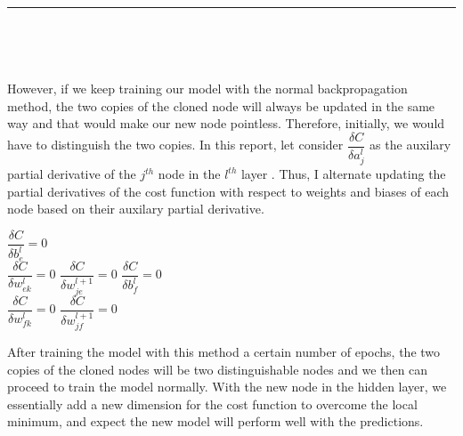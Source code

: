 \documentclass[12pt,english,]{article}
\let\origfigure\figure
\let\endorigfigure\endfigure
\renewenvironment{figure}[1][2] {
    \expandafter\origfigure\expandafter[H]
} {
    \endorigfigure
}
\begin{document}
\hrule

~

~

However, if we keep training our model with the normal backpropagation method, the two copies of the cloned node will always be updated in the same way and that would make our new node pointless. Therefore, initially, we would have to distinguish the two copies. In this report, let consider $\dfrac{\delta C}{\delta a_{j}^{l}}$ as the auxilary partial derivative of the $j^{th}$ node in the $l^{th}$ layer . Thus, I alternate updating the partial derivatives of the cost function with respect to weights and biases of each node based on their auxilary partial derivative. 

\begin{figure}[ht]
  \centering
  \begin{minipage}{.9\linewidth}
    {\LinesNotNumbered
    \SetAlgoRefName{}
    \begin{algorithm}[H]
    \SetAlgoLined
    \BlankLine
    \centering
    \begin{minipage}{.75\linewidth}
         {
            $\dfrac{\delta C}{\delta b_{e}^{l}} = 0$\\
	     {
		$\dfrac{\delta C}{\delta w_{ek}^{l}} = 0$
	    }
	     {
		$\dfrac{\delta C}{\delta w_{je}^{l+1}} = 0$
	    }
        }
	 {
            $\dfrac{\delta C}{\delta b_{f}^{l}} = 0$\\
	     {
		$\dfrac{\delta C}{\delta w_{fk}^{l}} = 0$
	    }
	     {
		$\dfrac{\delta C}{\delta w_{jf}^{l+1}} = 0$
	    }
        }	
    \end{minipage}
    \caption{\textsc{Alternating node update method}}
    \end{algorithm}}
  \end{minipage}
\end{figure}

After training the model with this method a certain number of epochs, the two copies of the cloned nodes will be two distinguishable nodes and we then can proceed to train the model normally. With the new node in the hidden layer, we essentially add a new dimension for the cost function to overcome the local minimum, and expect the new model will perform well with the predictions.
\end{document}
